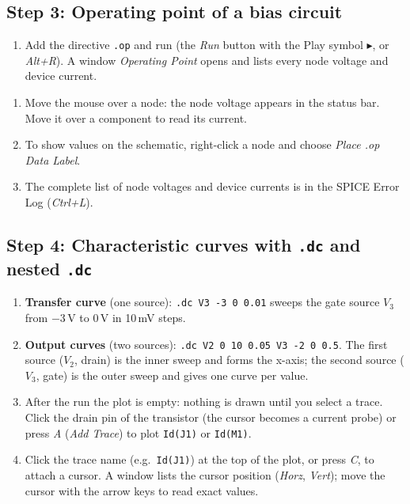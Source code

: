 \subsection{Step 3: Operating point of a bias circuit}
\begin{enumerate}[itemsep=2pt]
  \item Add the directive \texttt{.op} and run (the \textit{Run} button with the Play symbol $\blacktriangleright$, or \textit{Alt+R}). A window \textit{Operating Point}
        opens and lists every node voltage and device current.
\end{enumerate}
\begin{enumerate}[resume,itemsep=2pt]
  \item Move the mouse over a node: the node voltage appears in the status bar. Move it over a component to read its current.
  \item To show values on the schematic, right-click a node and choose \textit{Place .op Data Label}.
  \item The complete list of node voltages and device currents is in the SPICE Error Log (\textit{Ctrl+L}).
\end{enumerate}

\subsection{Step 4: Characteristic curves with \texttt{.dc} and nested \texttt{.dc}}
\begin{enumerate}[itemsep=2pt]
  \item \textbf{Transfer curve} (one source): \texttt{.dc V3 -3 0 0.01} sweeps the gate source $V_3$ from $-3$\,V to $0$\,V in 10\,mV steps.
  \item \textbf{Output curves} (two sources): \texttt{.dc V2 0 10 0.05 V3 -2 0 0.5}. The first source ($V_2$, drain) is the inner
        sweep and forms the x-axis; the second source ($V_3$, gate) is the outer sweep and gives one curve per value.
  \item After the run the plot is empty: nothing is drawn until you select a trace. Click the drain pin of the transistor (the cursor becomes a current probe) or press \textit{A} (\textit{Add Trace}) to plot \texttt{Id(J1)} or \texttt{Id(M1)}.
  \item Click the trace name (e.g.\ \texttt{Id(J1)}) at the top of the plot, or press \textit{C}, to attach a cursor. A window lists the cursor position (\textit{Horz}, \textit{Vert}); move the cursor with the arrow keys to read exact values.
\end{enumerate}

